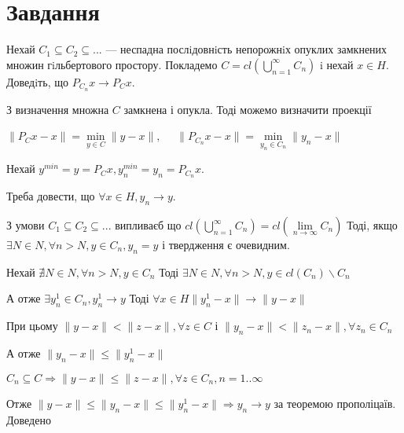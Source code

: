 

\chapter{Завдання \theHchapter}


\begin{tcolorbox}[title=Завдання]
    
    Нехай $C_1 \subseteq C_2 \subseteq ...$ — неспадна послiдовнiсть
    непорожнiх опуклих замкнених множин
    гiльбертового простору. Покладемо 
    $C = cl (\bigcup\limits_{n=1}^{\infty} C_n)$ i нехай $x \in H$. 
    Доведiть, що $P_{C_n} x \rightarrow P_Cx$.
    
\end{tcolorbox}




З визначення множна $C$ замкнена і опукла. Тоді можемо визначити проекції


$ \|P_Cx - x\| = \min\limits_{y \in C} \|y - x\|, \quad $
$ \|P_{C_n}x - x\| = \min\limits_{y_n \in C_n} \|y_n - x\| $


Нехай $y^{min} = y = P_Cx, y_n^{min} = y_n = P_{C_n}x$.


Треба довести, що $\forall x \in H, y_n \rightarrow y$.


З умови $C_1 \subseteq C_2 \subseteq ...$ випливаєб що
$cl (\bigcup\limits_{n=1}^{\infty} C_n) = 
cl(\lim\limits_{n \rightarrow \infty}C_n) $
Тоді, якщо $ \exists N \in N, \forall n > N, y \in C_n, y_n = y$
і твердження є очевидним.


Нехай $\nexists N \in N, \forall n > N, y \in C_n$ 
Тоді $\exists N \in N, \forall n > N,
y \in cl(C_n) \backslash C_n$


А отже $\exists y_n^1 \in C_n, y_n^1 \rightarrow y$ 
Тоді $\forall x \in H \|y_n^1 - x\| \rightarrow \|y - x\|$ 


При цьому $\|y - x\| < \|z - x\|, \forall z \in C $
і $ \|y_n - x\| < \|z_n - x\|, \forall z_n \in C_n $


А отже $ \|y_n - x\| \le \|y_n^1 - x\| $


$C_n \subseteq C \Rightarrow \|y - x\| \le \|z - x\|, 
\forall z \in C_n, n=1..\infty$

Отже 
$\|y - x\| \le  \|y_n - x\| \le \|y_n^1 - x\| 
\Rightarrow y_n \rightarrow y$ за теоремою прополіцаїв. 
Доведено
